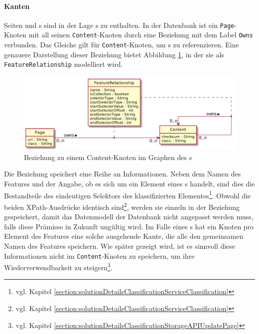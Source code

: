     \paragraph{Kanten}
    Seiten und {\contentFeature}s sind in der Lage {\contentFeature}s zu enthalten.
    In der Datenbank ist ein \texttt{Page}-Knoten mit all seinen \texttt{Content}-Knoten
    durch eine Beziehung mit dem Label \texttt{Owns} verbunden.
    Das Gleiche gilt für \texttt{Content}-Knoten, um {\childFeature}s zu referenzieren.
    Eine genauere Darstellung dieser Beziehung bietet Abbildung \ref{image:dbDataModelContentRelationship},
    in der sie als \texttt{FeatureRelationship} modelliert wird.

    \begin{figure}
        \centering
        \includegraphics[scale=\imageScalingFactor]{../resources/db-data-model/content-relationship.png}
        \caption{Beziehung zu einem Content-Knoten im Graphen des {\classificationStorage}s}
        \label{image:dbDataModelContentRelationship}
    \end{figure}

    Die Beziehung speichert eine Reihe an Informationen.
    Neben dem Namen des Features und der Angabe,
    ob es sich um ein Element eines {\collectionFeature}s handelt,
    sind dies die Bestandteile des eindeutigen Selektors des
    klassifizierten Elementes\footnote{vgl. Kapitel \ref{section:solutionDetailsClassificationServiceClassification}}.
    Obwohl die beiden XPath-Ausdrücke identisch sind\footnote{vgl. Kapitel \ref{section:solutionDetailsClassificationServiceClassification}},
    werden sie einzeln in der Beziehung gespeichert, damit das Datenmodell der Datenbank
    nicht angepasst werden muss, falls diese Prämisse in Zukunft ungültig wird.
    Im Falle eines {\collectionFeature}s hat ein Knoten pro Element des Features eine solche
    ausgehende Kante, die alle den gemeinsamen Namen des Features speichern.
    Wie später gezeigt wird, ist es sinnvoll diese Informationen nicht im \texttt{Content}-Knoten
    zu speichern, um ihre Wiederverwendbarkeit zu
    steigern\footnote{vgl. Kapitel \ref{section:solutionDetailsClassificationStorageAPIUpdatePage}}.

